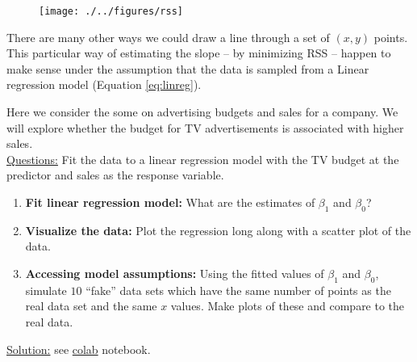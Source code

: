 \begin{figure}[h]
\centering
\texttt{[image: ./../figures/rss]}
\caption{ }\label{rss}
\end{figure}


There are many other ways we could draw a line through a set of $(x,y)$ points. This particular way of estimating the slope -- by minimizing RSS -- happen to make sense under the assumption that  the data is sampled from a Linear regression model (Equation \ref{eq:linreg}). 



\begin{example}
Here we consider the some on advertising budgets and sales for a company. We will explore whether the budget for TV advertisements is associated with higher sales. \\

 \noindent
\underline{Questions:} Fit the data to a linear regression model with the TV budget at the  predictor and sales as the response variable. 
\begin{enumerate}[label=(\alph*)]
\item {\bf Fit linear regression model:} What are the estimates of $\beta_1$ and $\beta_0$? 
\item {\bf Visualize the data:} Plot the regression long along with a scatter plot of the data. 
\item {\bf Accessing model assumptions:} Using the fitted values of $\beta_1$ and $\beta_0$, simulate $10$ ``fake'' data sets which have the same number of points as the real data set and the same $x$ values.  Make plots of these and compare to the real data.  \\
\end{enumerate}

 \noindent
\underline{Solution:} see \href{https://colab.research.google.com/drive/1_4zOruAWfJ3HQoIf9sjefk3z0APko94-?usp=sharing}{colab} notebook. 
\end{example}








